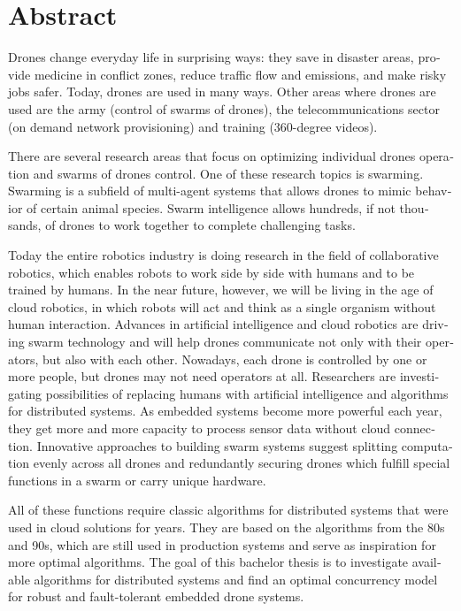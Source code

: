 \chapter{Abstract}


\begin{english} %

Drones change everyday life in surprising ways: they save in disaster areas, provide medicine in conflict zones, reduce traffic flow and emissions, and make risky jobs safer. Today, drones are used in many ways. Other areas where drones are used are the army (control of swarms of drones), the telecommunications sector (on demand network provisioning) and training (360-degree videos).

There are several research areas that focus on optimizing individual drones operation and swarms of drones control. One of these research topics is swarming. Swarming is a subfield of multi-agent systems that allows drones to mimic behavior of certain animal species. Swarm intelligence allows hundreds, if not thousands, of drones to work together to complete challenging tasks. 

Today the entire robotics industry is doing research in the field of collaborative robotics, which enables robots to work side by side with humans and to be trained by humans. In the near future, however, we will be living in the age of cloud robotics, in which robots will act and think as a single organism without human interaction. Advances in artificial intelligence and cloud robotics are driving swarm technology and will help drones communicate not only with their operators, but also with each other. Nowadays, each drone is controlled by one or more people, but drones may not need operators at all. Researchers are investigating possibilities of replacing humans with artificial intelligence and algorithms for distributed systems. As embedded systems become more powerful each year, they get more and more capacity to process sensor data without cloud connection. Innovative approaches to building swarm systems suggest splitting computation evenly across all drones and redundantly securing drones which fulfill special functions in a swarm or carry unique hardware.

All of these functions require classic algorithms for distributed systems that were used in cloud solutions for years. They are based on the algorithms from the 80s and 90s, which are still used in production systems and serve as inspiration for more optimal algorithms. The goal of this bachelor thesis is to investigate available algorithms for distributed systems and find an optimal concurrency model for robust and fault-tolerant embedded drone systems.


\end{english}

